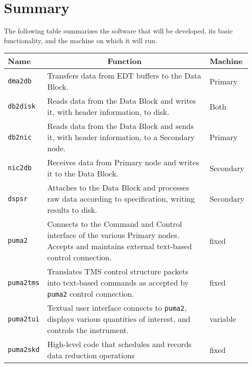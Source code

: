 \chapter{Summary}

The following table summarizes the software that will be developed,
its basic functionality, and the machine on which it will run.

\vspace{5mm}

\begin{tabular}{l|p{8cm}|l}

Name & \multicolumn{1}{c}{Function} & Machine \\ \hline

{\tt dma2db} & Transfers data from EDT buffers to the Data Block.
	& Primary \\

{\tt db2disk} & Reads data from the Data Block and writes it, with
	header information, to disk. & Both \\

{\tt db2nic} & Reads data from the Data Block and sends it, with
	header information, to a Secondary node. & Primary \\

{\tt nic2db} & Receives data from Primary node and writes it to the 
	Data Block. & Secondary \\

{\tt dspsr} & Attaches to the Data Block and processes raw data
	according to specification, writing results to disk. &
	Secondary \\

{\tt puma2} & Connects to the Command and Control interface of the
	various Primary nodes.  Accepts and maintains external
	text-based control connection.  & fixed \\

{\tt puma2tms} & Translates TMS control structure packets into
	text-based commands as accepted by {\tt puma2} control
	connection. & fixed \\

{\tt puma2tui} & Textual user interface connects to {\tt puma2},
	displays various quantities of interest, and controls
	the instrument. & variable \\

{\tt puma2skd} & High-level code that schedules and records
        data reduction operations & fixed \\

\end{tabular}


